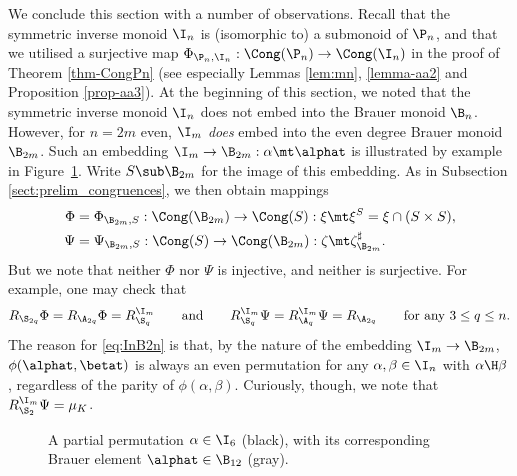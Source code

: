 We conclude this section with a number of observations.
Recall that the symmetric inverse monoid $\I_n$ is (isomorphic to) a submonoid of $\P_n$, and that we utilised a surjective map $\Phi_{\P_n,\I_n}:\Cong(\P_n)\to\Cong(\I_n)$ in the proof of Theorem \ref{thm-CongPn} (see especially Lemmas \ref{lem:mn}, \ref{lemma-aa2} and Proposition \ref{prop-aa3}).
%
At the beginning of this section, we noted that the symmetric inverse monoid $\I_n$ does not embed into the Brauer monoid $\B_{n}$.
However, for $n=2m$ even,
$\I_m$ \emph{does} embed into the even degree Brauer monoid $\B_{2m}$.
Such an embedding $\I_m\to\B_{2m}:\alpha\mt\alphat$ is illustrated by example in Figure~\ref{fig:ImB2m}.  Write $S\sub\B_{2m}$ for the image of this embedding.  As in Subsection \ref{sect:prelim_congruences}, we then obtain mappings
\begin{align*}
\Phi&=\Phi_{\B_{2m},S}:\Cong(\B_{2m})\to\Cong(S):\xi\mt\xi^S=\xi\cap(S\times S),\\
\Psi&=\Psi_{\B_{2m},S}:\Cong(S)\to\Cong(\B_{2m}):\zeta\mt\zeta_{\B_{2m}}^\sharp.
\end{align*}
But we note that neither $\Phi$ nor $\Psi$ is injective, and neither is surjective.  For example, one may check that
\begin{equation}\label{eq:InB2n}
R_{\S_{2q}}\Phi=R_{\A_{2q}}\Phi=R_{\S_q}^{\I_m} \qquad\text{and}\qquad
R^{\I_m}_{\S_{q}}\Psi=R^{\I_m}_{\A_{q}}\Psi=R_{\A_{2q}} \qquad\text{for any $3\leq q\leq n$.}
\end{equation}
The reason for \eqref{eq:InB2n} is that, by the nature of the embedding $\I_m\to\B_{2m}$, $\phi(\alphat,\betat)$ is always an even permutation for any $\alpha,\beta\in\I_n$ with $\alpha\H\beta$, regardless of the parity of $\phi(\alpha,\beta)$.
%
Curiously, though, we note that $R_{\S_2}^{\I_m}\Psi=\mu_K$.


\begin{figure}[ht]
\begin{center}
\end{center}
\vspace{-5mm}
\caption{A partial permutation $\alpha\in\I_6$ (black), with its corresponding Brauer element $\alphat\in\B_{12}$ (gray).}
\label{fig:ImB2m}
\end{figure}



